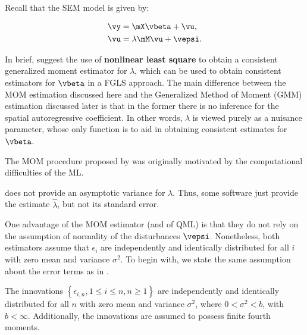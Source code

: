 \documentclass[english,12pt]{book}\usepackage[]{graphicx}\usepackage[]{xcolor}
\begin{document}
Recall that the SEM model is given by:

\begin{equation}\label{eq:sem_gmm}
	\begin{aligned}
	\vy  & = \mX\vbeta + \vu, \\ 
	\vu & = \lambda \mM \vu + \vepsi.
	\end{aligned}
\end{equation}

In brief, \cite{kelejian1999generalized} suggest the use of \textbf{nonlinear least square} to obtain a consistent generalized moment estimator for $\lambda$, which can be used to obtain consistent estimators for $\vbeta$ in a FGLS approach. The main difference between the MOM estimation discussed here and the Generalized Method of Moment (GMM) estimation discussed later is that in the former there is no inference for the spatial autoregressive coefficient. In other words, $\lambda$ is viewed purely as a nuisance parameter, whose only function is to aid in obtaining consistent estimates for $\vbeta$. 

\begin{remark}
The MOM procedure proposed by \cite{kelejian1999generalized} was originally motivated by the computational difficulties of the ML.
\end{remark}

\begin{remark}
\cite{kelejian1999generalized} does not provide an asymptotic variance for $\lambda$. Thus, some software just provide the estimate $\widehat{\lambda}$, but not its standard error. 
\end{remark}


One advantage of the MOM estimator (and of QML) is that they do not rely on the assumption of normality of the disturbances $\vepsi$. Nonetheless, both estimators assume that $\epsilon_i$ are independently and identically distributed for all $i$ with zero mean and variance $\sigma^2$. To begin with, we state the same assumption about the error terms as in \cite{kelejian1999generalized}.

\begin{assumption}\label{assu:errors_triang_homokedastic}
The innovations $\left\lbrace \epsilon_{i,n}, 1 \leq i \leq n, n\geq 1\right\rbrace$ are independently and identically distributed for all $n$ with zero mean and variance $\sigma^2$, where $0 < \sigma^2 < b$, with $b < \infty$. Additionally, the innovations are assumed to possess finite fourth moments. 
\end{assumption}
\end{document}

